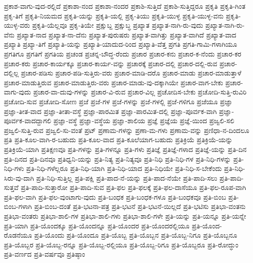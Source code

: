 {ಪ್ರಕಾಶ-ವಾಗು-ವುದ-ರಲ್ಲಿದೆ
ಪ್ರಕಾಶಾ-ನಂದ
ಪ್ರಕಾಶಾ-ನಂದರ
ಪ್ರಕಾಶಿ-ಸುತ್ತಿದೆ
ಪ್ರಕಾಶಿ-ಸುತ್ತಿದ್ದರೂ
ಪ್ರಕೃತಿ
ಪ್ರಕೃತಿ-ಗಿಂತ
ಪ್ರಕೃ-ತಿಗೆ
ಪ್ರಕೃತಿ-ನಿಯಮದ
ಪ್ರಕೃತಿ-ಯನ್ನು
ಪ್ರಕೃತಿ-ಯಲ್ಲಿ
ಪ್ರಕೃ-ತಿಯು
ಪ್ರಕೃತಿ-ಯುಳ್ಳ
ಪ್ರಕೃತಿ-ಯುಳ್ಳ-ವನು
ಪ್ರಕೃತಿ-ಯುಳ್ಳ-ವರು
ಪ್ರಕೃತಿ-ಯೆಲ್ಲವೂ
ಪ್ರಕೃ-ತಿಯೇ
ಪ್ರಕ್ಷುಬ್ದ
ಪ್ರಕ್ಷುಬ್ಧ
ಪ್ರಖ್ಯಾತ
ಪ್ರಖ್ಯಾತ-ನಾಗಿ-ರು-ವುದು
ಪ್ರಖ್ಯಾತ-ನಾಗಿ-ರು-ವೆನು
ಪ್ರಖ್ಯಾತ-ನಾದ
ಪ್ರಖ್ಯಾತ-ನಾ-ದೆನು
ಪ್ರಖ್ಯಾತ-ಪುರುಷರು
ಪ್ರಖ್ಯಾತ-ವಾಗಿತ್ತು
ಪ್ರಖ್ಯಾತ-ವಾಗಿದೆ
ಪ್ರಖ್ಯಾತ-ವಾದ
ಪ್ರಖ್ಯಾತಿ
ಪ್ರಖ್ಯಾ-ತಿಗೆ
ಪ್ರಖ್ಯಾತಿ-ಯನ್ನು
ಪ್ರಖ್ಯಾತಿ-ಯಾದುದ-ರಿಂದ
ಪ್ರಖ್ಯಾತಿ-ವೆತ್ತ
ಪ್ರಗತಿ
ಪ್ರಗತಿ-ಗಾಮಿ-ಗಳಾಗಿಯೂ
ಪ್ರಗತಿಗೂ
ಪ್ರಗತಿಗೆ
ಪ್ರಗತಿಯ
ಪ್ರಚಂಡ
ಪ್ರಚನ್ನ-ಬೌದ್ಧ-ರೆಂದು
ಪ್ರಚಾರ
ಪ್ರಚಾರ-ಕನು
ಪ್ರಚಾರ-ಕ-ನೆಂದು
ಪ್ರಚಾರ-ಕರ
ಪ್ರಚಾರ-ಕರು
ಪ್ರಚಾರ-ಕಾರ್ಯಕ್ಕೂ
ಪ್ರಚಾರ-ಕಾರ್ಯ-ವನ್ನು
ಪ್ರಚಾರಕ್ಕೆ
ಪ್ರಚಾರ-ದಲ್ಲಿ
ಪ್ರಚಾರ-ದಲ್ಲಿ-ರುವ
ಪ್ರಚಾರ-ದಲ್ಲಿಲ್ಲ
ಪ್ರಚಾರ-ಪಡಿಸು
ಪ್ರಚಾರ-ಪಡಿ-ಸುತ್ತಿರು-ವರು
ಪ್ರಚಾರ-ಮಾಡಿ-ದರೊ
ಪ್ರಚಾರ-ಮಾಡು
ಪ್ರಚಾರ-ಮಾಡುತ್ತಾಳೆ
ಪ್ರಚಾರ-ಮಾಡುತ್ತಿರುವ
ಪ್ರಚಾರ-ಮಾಡುತ್ತಿರು-ವರು
ಪ್ರಚಾರ-ಮಾಡು-ವು-ದಕ್ಕಾಗಿಯೇ
ಪ್ರಚಾರ-ವಾಗ-ಬೇಕು
ಪ್ರಚಾರ-ವಾಗು-ವುದು
ಪ್ರಚಾರ-ವಾ-ದುವು-ಗಳನ್ನು
ಪ್ರಚಾರ-ವಿ-ರುವ
ಪ್ರಚಾರ-ವಿಲ್ಲ
ಪ್ರಚೋದಿಸ-ಬೇಕು
ಪ್ರಚೋದಿ-ಸುತ್ತಿ-ರುವಿರಿ
ಪ್ರಚೋದಿ-ಸುವ
ಪ್ರಚೋದಿ-ಸೋಣ
ಪ್ರಜೆ
ಪ್ರಜೆ-ಗಳ
ಪ್ರಜೆ-ಗಳನ್ನು
ಪ್ರಜೆ-ಗಳಲ್ಲಿ
ಪ್ರಜೆ-ಗಳಿಗೂ
ಪ್ರಜೆಯೂ
ಪ್ರಜ್ಞಾ
ಪ್ರಜ್ಞಾ-ತೀತ-ವಾದ
ಪ್ರಜ್ಞಾ-ತೀತಾ-ವಸ್ಥೆ
ಪ್ರಜ್ಞಾ-ಪಾರಮಿತ
ಪ್ರಜ್ಞಾ-ಪಾರಮಿತ-ದಲ್ಲಿ
ಪ್ರಜ್ಞಾ-ಪೂರ್ವಕ-ವಾಗಿ
ಪ್ರಜ್ಞಾ-ಪೂರ್ವಕ-ವಾದದ್ದಾಗಲಿ
ಪ್ರಜ್ಞಾ-ವಸ್ಥೆ
ಪ್ರಜ್ಞಾ-ವಸ್ಥೆಯ
ಪ್ರಜ್ಞಾ-ಶಾಲಿಯ
ಪ್ರಜ್ಞೆ
ಪ್ರಜ್ಞೆಯ
ಪ್ರಜ್ಞೆ-ಯಿಂದ
ಪ್ರಜ್ವಲಿ-ಸಲಿ
ಪ್ರಜ್ವಲಿ-ಸುತ್ತಿ-ರುವ
ಪ್ರಜ್ವಲಿ-ಸು-ವಂತೆ
ಪ್ರಟ್
ಪ್ರಣಾಮ-ಗಳನ್ನು
ಪ್ರಣಾ-ಮ-ಗಳು
ಪ್ರಣಾಮ-ವನ್ನು
ಪ್ರಣಿಧಾ-ನ-ದಿಂದಲೂ
ಪ್ರತಿ
ಪ್ರತಿ-ಕೂಲ-ವಾಗಿ-ರ-ಬಹುದು
ಪ್ರತಿ-ಕೂಲ-ವಾದ
ಪ್ರತಿ-ಕೂಲೆಯಾಗ-ಬಹುದು
ಪ್ರತಿಕ್ರಿಯೆ
ಪ್ರತಿಕ್ರಿಯೆ-ಯನ್ನು
ಪ್ರತಿಕ್ರಿಯೆ-ಯಾಗಿ
ಪ್ರತಿಕ್ಷಣವೂ
ಪ್ರತಿ-ಗಳನ್ನು
ಪ್ರತಿ-ಗಳನ್ನೂ
ಪ್ರತಿ-ಗಳು
ಪ್ರತಿಜ್ಞೆ
ಪ್ರತಿಜ್ಞೆ-ಗಳಾದ
ಪ್ರತಿಜ್ಞೆ-ಯನ್ನು
ಪ್ರತಿ-ದಿನ
ಪ್ರತಿ-ದಿನದ
ಪ್ರತಿ-ದಿನವೂ
ಪ್ರತಿಧ್ವನಿ-ಯನ್ನು
ಪ್ರತಿ-ನಿತ್ಯ
ಪ್ರತಿ-ನಿತ್ಯವೂ
ಪ್ರತಿ-ನಿಧಿ
ಪ್ರತಿ-ನಿಧಿ-ಗಳ
ಪ್ರತಿ-ನಿಧಿ-ಗಳನ್ನು
ಪ್ರತಿ-ನಿಧಿ-ಗಳು
ಪ್ರತಿ-ನಿಧಿ-ಗಳೆಲ್ಲರೂ
ಪ್ರತಿ-ನಿಧಿ-ಯಾಗಿ
ಪ್ರತಿ-ನಿಧಿ-ಯಾದ
ಪ್ರತಿ-ನಿಧಿಯೇ
ಪ್ರತಿ-ನಿಧಿ-ಸ-ಬೇಕೆಂದು
ಪ್ರತಿ-ನಿಧಿ-ಸಿರು-ವು-ದಾಗಿ
ಪ್ರತಿ-ನಿಧಿ-ಸುತ್ತಿಲ್ಲ
ಪ್ರತಿ-ಪಕ್ಷಿ
ಪ್ರತಿ-ಪಾದ-ನೆ-ಯನ್ನು
ಪ್ರತಿ-ಪಾದ-ನೆಯೇ
ಪ್ರತಿ-ಪಾದಿ-ಸಲು
ಪ್ರತಿ-ಪಾದಿ-ಸುತ್ತವೆ
ಪ್ರತಿ-ಪಾದಿ-ಸುತ್ತಾರೋ
ಪ್ರತಿ-ಪಾದಿ-ಸುವ
ಪ್ರತಿ-ಫಲ
ಪ್ರತಿ-ಫಲಕ್ಕೆ
ಪ್ರತಿ-ಫಲ-ದಾಸೆಯೂ
ಪ್ರತಿ-ಫಲ-ರೂಪ-ವಾಗಿ
ಪ್ರತಿ-ಫಲ-ವಾಗಿ
ಪ್ರತಿ-ಫಲ-ವುಂಟಾಗು-ವುದು
ಪ್ರತಿ-ಬಂಧಕ
ಪ್ರತಿ-ಬಂಧಕ-ಗಳೂ
ಪ್ರತಿ-ಬಂಧಕವೂ
ಪ್ರತಿ-ಬಿಂಬ
ಪ್ರತಿ-ಬಿಂಬ-ಗಳಾಗಿ
ಪ್ರತಿ-ಬಿಂಬ-ದಂತೆ
ಪ್ರತಿ-ಭಟನಾ-ಪತ್ರ
ಪ್ರತಿ-ಭಟನೆ
ಪ್ರತಿ-ಭಟನೆ-ಯಿಲ್ಲದೆ
ಪ್ರತಿ-ಭಟಿಸು
ಪ್ರತಿಭಾ-ವಂತನು
ಪ್ರತಿಭಾ-ವಂತರು
ಪ್ರತಿಭಾ-ಶಾಲಿ-ಗಳ
ಪ್ರತಿಭಾ-ಶಾಲಿ-ಗಳು
ಪ್ರತಿಭಾ-ಶಾಲಿ-ಗಳೇ
ಪ್ರತಿ-ಯನ್ನು
ಪ್ರತಿ-ಯನ್ನೂ
ಪ್ರತಿ-ಯನ್ನೇ
ಪ್ರತಿ-ಯಾಗಿ
ಪ್ರತಿ-ಯೊಂದಕ್ಕೂ
ಪ್ರತಿ-ಯೊಂದನ್ನೂ
ಪ್ರತಿ-ಯೊಂದರ
ಪ್ರತಿ-ಯೊಂದರಲ್ಲಿಯೂ
ಪ್ರತಿ-ಯೊಂದ-ರೊಡನೆಯೂ
ಪ್ರತಿ-ಯೊಂದು
ಪ್ರತಿ-ಯೊಂದೂ
ಪ್ರತಿ-ಯೊಬ್ಬ
ಪ್ರತಿ-ಯೊಬ್ಬನ
ಪ್ರತಿ-ಯೊಬ್ಬ-ನಿಗೂ
ಪ್ರತಿ-ಯೊಬ್ಬನೂ
ಪ್ರತಿ-ಯೊಬ್ಬರ
ಪ್ರತಿ-ಯೊಬ್ಬ-ರನ್ನೂ
ಪ್ರತಿ-ಯೊಬ್ಬ-ರಲ್ಲಿಯೂ
ಪ್ರತಿ-ಯೊಬ್ಬ-ರಿಗೂ
ಪ್ರತಿ-ಯೊಬ್ಬರೂ
ಪ್ರತಿ-ರೋದ್ಧುಂ
ಪ್ರತಿ-ವರ್ಣದ
ಪ್ರತಿ-ವರ್ಷವೂ
ಪ್ರತಿಷ್ಠಾಂ
}
